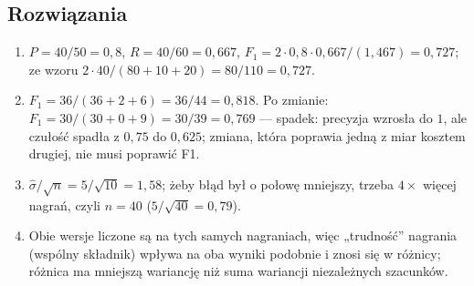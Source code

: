 \subsection*{Rozwiązania}
\begin{enumerate}
\item $P=40/50=0{,}8$, $R=40/60=0{,}667$, $F_1=2\cdot0{,}8\cdot0{,}667/(1{,}467)=0{,}727$; ze wzoru $2\cdot40/(80+10+20)=80/110=0{,}727$. \checkmark
\item $F_1=36/(36+2+6)=36/44=0{,}818$. Po zmianie: $F_1=30/(30+0+9)=30/39=0{,}769$ --- spadek: precyzja wzrosła do $1$, ale czułość spadła z $0{,}75$ do $0{,}625$; zmiana, która poprawia jedną z miar kosztem drugiej, nie musi poprawić F1.
\item $\hat\sigma/\sqrt n=5/\sqrt{10}=1{,}58$; żeby błąd był o połowę mniejszy, trzeba $4\times$ więcej nagrań, czyli $n=40$ ($5/\sqrt{40}=0{,}79$).
\item Obie wersje liczone są na tych samych nagraniach, więc „trudność” nagrania (wspólny składnik) wpływa na oba wyniki podobnie i znosi się w różnicy; różnica ma mniejszą wariancję niż suma wariancji niezależnych szacunków.
\end{enumerate}
